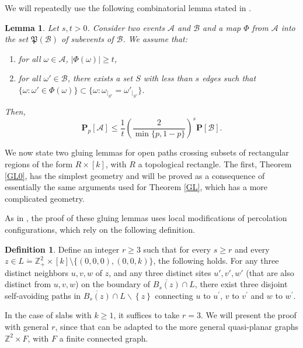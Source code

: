 \documentclass[12pt, twoside,a4paper,reqno]{amsart}
\theoremstyle{plain}
\newtheorem{lemma}[theorem]{Lemma}
\theoremstyle{remark}
\theoremstyle{definition}
\newtheorem{definition}{Definition}[section]
\newcommand{\PP}{\mathbf{P}}
\renewcommand{\P}[1]{\PP \left [ #1 \right ]}
\newcommand{\Pp}[1]{\PP_p \left [ #1 \right ]}
\newcommand{\cal}{\mathcal}
\newcommand{\ol}{\overline}
\begin{document}
We will repeatedly use the following combinatorial lemma stated in \cite{DST}.

\begin{lemma}
\label{combi0}
Let $s,t>0$. Consider two events $\cal A$ and $\cal B$ and a map $\Phi$ from
$\cal A$ into the set $\mathfrak{P}(\cal B)$ of subevents of $\cal B$. We assume
that:
  \begin{enumerate}
  \item for all $\omega\in \cal A$, $|\Phi(\omega)|\geq t$,
  \item for all $\omega' \in \cal B$, there exists a set $S$ with less than
  $s$ edges such that $\{\omega: \omega' \in \Phi(\omega)
    \} \subset \{\omega : \omega_{|_{S^c}}=\omega'_{|_{S^c}}\}$.
  \end{enumerate}
  Then,
  \begin{equation}
     \Pp{\cal A}\leq\frac1t \left(\frac2{\min\{p,1-p\}}\right)^s \P{\cal B}.
  \end{equation}
\end{lemma}

We now state two gluing lemmas for open paths crossing subsets of rectangular regions
 of the form $R\times[k]$, with $R$ a topological rectangle. The first, Theorem \ref{GL0}, has the simplest geometry
and will be proved as a consequence of essentially the same arguments used for Theorem \ref{GL}, which has a more complicated geometry.

As in \cite{DST}, the proof of these gluing lemmas uses local modifications of
percolation configurations, which rely on the following definition.
\begin{definition}\label{def:rad1}
  Define an integer $r\geq 3$ such that for every $s\ge r $ and every $z\in L
  \dot{=} \mathbb{Z}_{+}^{2}\times [k] \setminus \{(0,0,0),(0,0,k)\} $, the following holds.
 For any three distinct neighbors $u,v,w$ of $z$, and any three distinct
    sites $u',v',w'$ (that are also distinct from $u,v,w$) on the boundary of $%
    \ol{B_{s}\left( z\right)} \cap L$, there exist three disjoint self-avoiding
    paths in $\ol{B_{s}\left( z\right)} \cap L\backslash \left\{ z\right\} $
    connecting $u$ to $u^{\prime }$, $v$ to $v^{\prime }$ and $w$ to
    $w^{\prime}$.
  \end{definition}
In the case of slabs with $k\geq 1$, it suffices to take $r=3$. We will present
the proof with general $r$, since that can be adapted to the more general
quasi-planar graphs $\mathbb{Z}^{2} \times F$, with $F$ a finite connected
graph.
\end{document}
